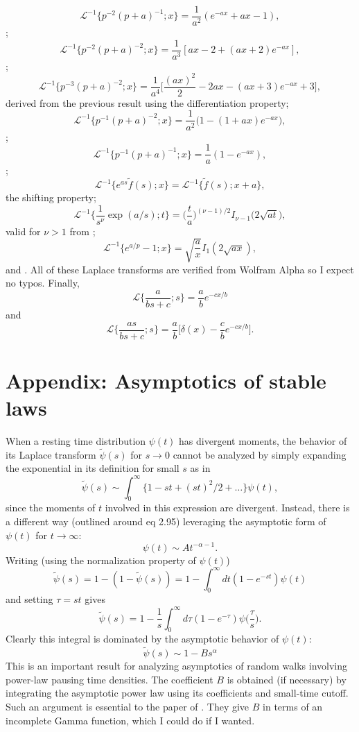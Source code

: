 \documentclass[11pt]{article}
\newcommand\be{\begin{equation}} %
\newcommand\ee{\end{equation}}   %
\newcommand\El{\mathcal{L}}
\begin{document}
\be \El^{-1}\Big\{p^{-2}(p+a)^{-1};x\Big\} = \frac{1}{a^2}(e^{-ax}+ax-1),\ee
\citep[][2.1.2.33]{Prudnikov1986};
\be \El^{-1}\Big\{p^{-2}(p+a)^{-2};x\Big\} = \frac{1}{a^3}[ax - 2 + (ax+2)e^{-ax}],\ee
\citep[][2.1.2.49]{Prudnikov1986};
\be \El^{-1}\Big\{p^{-3}(p+a)^{-2};x\Big\} = \frac{1}{a^4}\Big[\frac{(ax)^2}{2} - 2ax - (ax+3)e^{-ax} + 3\Big], \ee
derived from the previous result using the differentiation property;
\be \El^{-1}\Big\{p^{-1}(p+a)^{-2};x\Big\} = \frac{1}{a^2}\Big(1 -(1+ax)e^{-ax}\Big),\ee
\citep[][2.1.2.47]{Prudnikov1986};
\be \El^{-1}\Big\{p^{-1}(p+a)^{-1};x\Big\} = \frac{1}{a}(1-e^{-ax}),\ee
\citep[][2.1.2.31]{Prudnikov1986};
\be\El^{-1} \{e^{as}\tilde{f}(s);x\} = \El^{-1}\{\tilde{f}(s);x+a\},\ee
the shifting property;
\be \El^{-1}\big\{\frac{1}{s^\nu}\exp(a/s);t\} = \Big(\frac{t}{a}\Big)^{(\nu-1)/2}I_{\nu-1}\big(2\sqrt{a t}\big), \ee
valid for $\nu>1$ from \citep[][2.2.2.1]{Prudnikov1986};
\be \El^{-1}\{e^{a/p}-1;x\} = \sqrt{\frac{a}{x}}I_1(2\sqrt{ax}),\ee
and \citep[][2.2.2.8]{Prudnikov1986}.
All of these Laplace transforms are verified from Wolfram Alpha so I expect no typos.
Finally,
\be \El\Big\{\frac{a}{bs+c};s\Big\} = \frac{a}{b}e^{-cx/b}\ee
and
\be \El\Big\{\frac{as}{bs+c};s\Big\} = \frac{a}{b}\Big[\delta(x) - \frac{c}{b}e^{-cx/b}\Big].\ee


\section*{Appendix: Asymptotics of stable laws}
When a resting time distribution $\psi(t)$ has divergent moments, the behavior of its Laplace transform $\tilde{\psi}(s)$ for $s\rightarrow0$ cannot be analyzed by simply expanding the exponential in its definition for small $s$ as in 
\be \tilde{\psi}(s) \sim \int_0^\infty \{1-st + (st)^2/2 + \dots \} \psi(t),\ee
since the moments of $t$ involved in this expression are divergent. 
Instead, there is a different way (outlined around \citet{Weiss1994} eq 2.95) leveraging the asymptotic form of $\psi(t)$ for $t\rightarrow \infty$:
\be \psi(t) \sim  A t^{-\alpha-1}.\ee
Writing (using the normalization property of $\psi(t)$)
\be \tilde{\psi}(s) = 1 - (1- \tilde{\psi}(s)) = 1 - \int_0^\infty dt (1-e^{-st})\psi(t) \ee
and setting $\tau = st$ gives
\be \tilde{\psi}(s) = 1 - \frac{1}{s} \int_0^\infty d\tau (1-e^{-\tau})\psi\big(\frac{\tau}{s}\big).\ee
Clearly this integral is dominated by the asymptotic behavior of $\psi(t)$:
\be \tilde{\psi}(s) \sim 1 - B s^\alpha \ee
This is an important result for analyzing asymptotics of random walks involving power-law pausing time densities.
The coefficient $B$ is obtained (if necessary) by integrating the asymptotic power law using its coefficients and small-time cutoff.
Such an argument is essential to the paper of \citet{Weeks1998}. They give $B$ in terms of an incomplete Gamma function, which I could do if I wanted.

\end{document}
